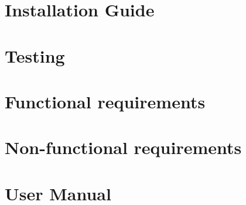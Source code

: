 \appendix

\renewcommand\chaptername{Appendix}

\chapter{Installation Guide} 
\label{appendix:installation_guide}


\chapter{Testing}
\label{appendix:TToE}


\chapter{Functional requirements}
\label{appendix:func_req}


\chapter{Non-functional requirements}
\label{appendix:non-func_req}


\chapter{User Manual} 
\label{appendix:user_manual}
\localtableofcontents

